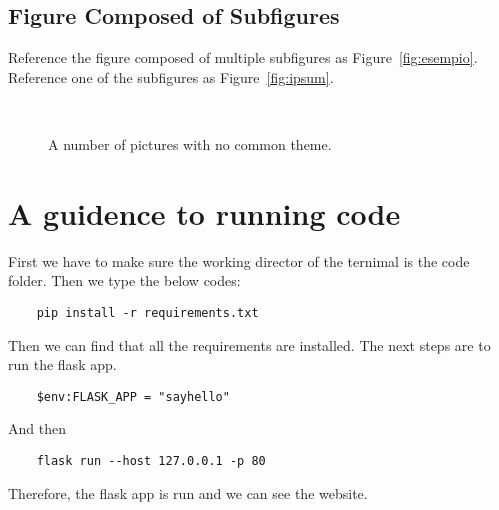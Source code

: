 \documentclass[
12pt, %
a4paper, %
oneside, %
headinclude,footinclude, %
BCOR5mm, %
]{scrartcl}
\begin{document}

\subsection{Figure Composed of Subfigures}

Reference the figure composed of multiple subfigures as Figure~\vref{fig:esempio}. Reference one of the subfigures as Figure~\vref{fig:ipsum}. %

\lipsum[15-18] %

\begin{figure}[tb]
\centering
{} \quad
{} \\
 \quad
{}
\caption[A number of pictures.]{A number of pictures with no common theme.} %
\label{fig:esempio}
\end{figure}


\renewcommand{\refname}{\spacedlowsmallcaps{References}} %


\clearpage



\clearpage
\appendix
\section{A guidence to running code}
First we have to make sure the working director of the ternimal is the code folder. Then we type the below codes:
\begin{lstlisting}
    pip install -r requirements.txt
\end{lstlisting}
Then we can find that all the requirements are installed. The next steps are to run the flask app. 
\begin{lstlisting}
    $env:FLASK_APP = "sayhello"
\end{lstlisting}
And then
\begin{lstlisting}
    flask run --host 127.0.0.1 -p 80
\end{lstlisting}
Therefore, the flask app is run and we can see the website.
\end{document}
